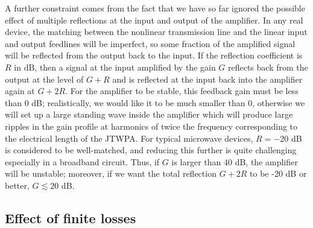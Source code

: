 A further constraint comes from the fact that we have so far ignored the possible effect of multiple reflections at the input and output of the amplifier.  In any real device, the matching between the nonlinear transmission line and the linear input and output feedlines will be imperfect, so some fraction of the amplified signal will be reflected from the output back to the input.  If the reflection coefficient is $R$ in dB, then a signal at the input amplified by the gain $G$ reflects back from the output at the level of $G+R$ and is reflected at the input back into the amplifier again at $G+2R$.  For the amplifier to be stable, this feedback gain must be less than 0 dB; realistically, we would like it to be much smaller than 0, otherwise we will set up a large standing wave inside the amplifier which will produce large ripples in the gain profile at harmonics of twice the frequency corresponding to the electrical length of the JTWPA.  For typical microwave devices, $R = -20$ dB is considered to be well-matched, and reducing this further is quite challenging especially in a broadband circuit.  Thus, if $G$ is larger than 40 dB, the amplifier will be unstable; moreover, if we want the total reflection $G+2R$ to be -20 dB or better, $G \lesssim 20$ dB.

\subsection{Effect of finite losses}\label{s:twpa_loss_theory}

